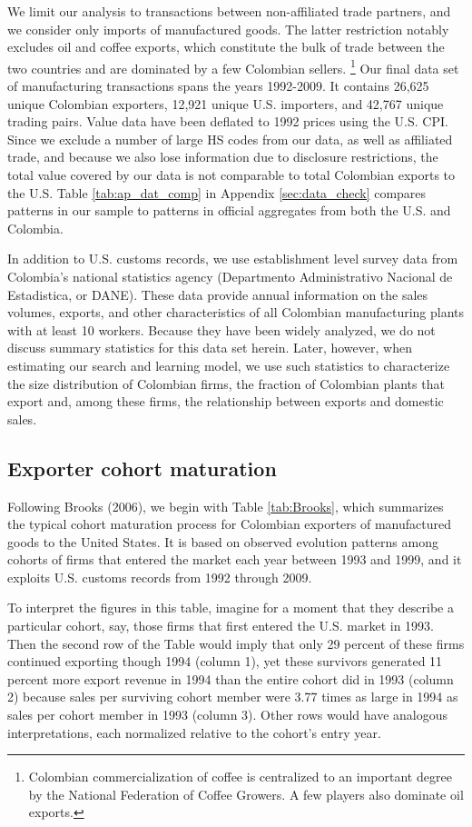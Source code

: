 \documentclass[12pt]{article}
\begin{document}
We limit our analysis to transactions between non-affiliated trade partners,
and we consider only imports of manufactured goods. The latter restriction
notably excludes oil and coffee exports, which constitute the bulk of trade
between the two countries and are dominated by a few Colombian sellers.%
\footnote{%
Colombian commercialization of coffee is centralized to an important degree
by the National Federation of Coffee Growers. A few players also dominate
oil exports.} Our final data set of manufacturing transactions spans the
years 1992-2009. It contains 26,625 unique Colombian exporters, 12,921
unique U.S. importers, and 42,767 unique trading pairs. Value data have been
deflated to 1992 prices using the U.S. CPI. Since we exclude a number of
large HS codes from our data, as well as affiliated trade, and because we
also lose information due to disclosure restrictions, the total value
covered by our data is not comparable to total Colombian exports to the U.S.
Table \ref{tab:ap_dat_comp} in Appendix \ref{sec:data_check} compares
patterns in our sample to patterns in official aggregates from both the U.S.
and Colombia.

In addition to U.S. customs records, we use establishment level survey data
from Colombia's national statistics agency (Departmento Administrativo
Nacional de Estadistica, or DANE). These data provide annual information on
the sales volumes, exports, and other characteristics of all Colombian
manufacturing plants with at least 10 workers. Because they have been widely
analyzed, we do not discuss summary statistics for this data set herein.
Later, however, when estimating our search and learning model, we use such
statistics to characterize the size distribution of Colombian firms, the
fraction of Colombian plants that export and, among these firms, the
relationship between exports and domestic sales.

\subsection{Exporter cohort maturation}

Following Brooks (2006), we begin with Table \ref{tab:Brooks}, which
summarizes the typical cohort maturation process for Colombian exporters of
manufactured goods to the United States. It is based on observed evolution
patterns among cohorts of firms that entered the market each year between
1993 and 1999, and it exploits U.S. customs records from 1992 through 2009. 

To interpret the figures in this table, imagine for a moment that they
describe a particular cohort, say, those firms that first entered the U.S.
market in 1993. Then the second row of the Table would imply that only 29
percent of these firms continued exporting though 1994 (column 1), yet these
survivors generated 11 percent more export revenue in 1994 than the entire
cohort did in 1993 (column 2) because sales per surviving cohort member were
3.77 times as large in 1994 as sales per cohort member in 1993 (column 3).
Other rows would have analogous interpretations, each normalized relative to
the cohort's entry year.
\end{document}
